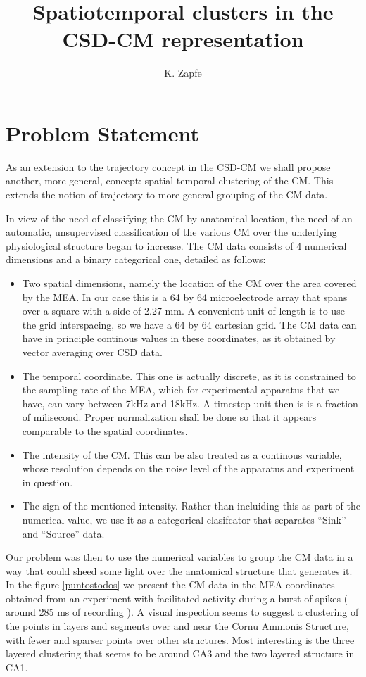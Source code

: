 \documentclass{article}
\author{K. Zapfe}
\title{Spatiotemporal clusters in the CSD-CM representation}
\begin{document}
\maketitle

\section{Problem Statement}

As an extension to the trajectory concept in the CSD-CM we
shall propose another,  more general, concept: spatial-temporal
clustering of the CM.
This extends the notion of trajectory to more general grouping of the
CM data.

In view of the need of classifying the CM by anatomical location,
the need of an automatic, unsupervised classification of the various CM
over the underlying physiological structure began to increase.  The CM data
consists of 4  numerical dimensions and a binary categorical
one, detailed as follows:
\begin{itemize}
\item Two spatial dimensions, namely the location of the CM over the
  area covered by the MEA. In our case this is a 64 by 64 microelectrode
  array that spans over a square with a side of 2.27 mm. A convenient unit
  of length is to use the grid interspacing, so we have a 64 by 64
  cartesian grid. The CM data can have in principle continous values in
  these coordinates, as it obtained by vector averaging over
  CSD data.
\item The temporal coordinate. This one is actually discrete, as it
  is constrained to the sampling rate of the MEA, which for experimental
  apparatus that we have, can vary between 7kHz and 18kHz. A timestep unit
  then is is a fraction of milisecond. Proper normalization shall be done so
  that it appears comparable to the spatial coordinates.
\item The intensity of the CM. This can be also treated as a continous
  variable, whose resolution depends on the noise level of the apparatus
  and experiment in question.
\item The sign of the mentioned intensity. Rather than incluiding this as
  part of the numerical value, we use it as a categorical clasifcator that
   separates ``Sink'' and ``Source'' data.
\end{itemize}
      

Our problem was then to use the numerical variables to group the CM data in
a way that could sheed some light over the anatomical structure that
generates it. In the figure \ref{puntostodos} we present the CM data
in the MEA coordinates obtained from an experiment with facilitated activity
during a burst of spikes ( around 285 ms of recording ). A visual inspection
seems to suggest a clustering of the points in layers and segments over and near the
Cornu Ammonis Structure, with fewer and sparser
points over other structures. Most interesting
is the three layered clustering that seems to be around CA3 and the two layered
structure in CA1. 
\end{document}

